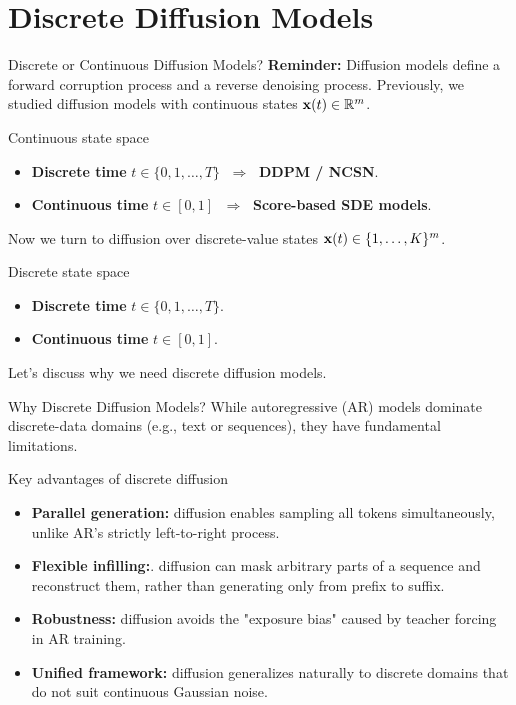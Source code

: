 \documentclass{beamer}
\renewcommand{\eqpause}{}
\begin{document}
\section{Discrete Diffusion Models}
\begin{frame}{Discrete or Continuous Diffusion Models?}
	\textbf{Reminder:} Diffusion models define a forward corruption process and a reverse denoising process.
	Previously, we studied diffusion models with continuous states $\mathbf{x}(t) \in \mathbb{R}^m$.
	\begin{block}{Continuous state space}
		\begin{itemize}
			\item \textbf{Discrete time} $t \in \{0,1,\ldots,T\}$ $\;\Rightarrow\;$ \textbf{DDPM / NCSN}.
			\item \textbf{Continuous time} $t \in [0,1]$ $\;\Rightarrow\;$ \textbf{Score-based SDE models}.
		\end{itemize}
	\end{block}
	\eqpause
	Now we turn to diffusion over discrete-value states $\mathbf{x}(t) \in \{1, \dots, K\}^m$.
	\begin{block}{Discrete state space}
		\begin{itemize}
			\item \textbf{Discrete time} $t \in \{0,1,\ldots,T\}$.
			\item \textbf{Continuous time} $t \in [0,1]$.
		\end{itemize}
	\end{block}
	Let's discuss why we need discrete diffusion models.
\end{frame}
\begin{frame}{Why Discrete Diffusion Models?}
	While autoregressive (AR) models dominate discrete-data domains (e.g., text or sequences), they have fundamental limitations.
	\eqpause
	\begin{block}{Key advantages of discrete diffusion}
		\begin{itemize}
			\item \textbf{Parallel generation:} diffusion enables sampling all tokens simultaneously, unlike AR’s strictly left-to-right process. 
			\eqpause
			\item \textbf{Flexible infilling:}. diffusion can mask arbitrary parts of a sequence and reconstruct them, rather than generating only from prefix to suffix.
			\eqpause 
			\item \textbf{Robustness:} diffusion avoids the "exposure bias" caused by teacher forcing in AR training.
			\eqpause
			\item \textbf{Unified framework:} diffusion generalizes naturally to discrete domains that do not suit continuous Gaussian noise.
		\end{itemize}
	\end{block}
\end{frame}
\end{document}
